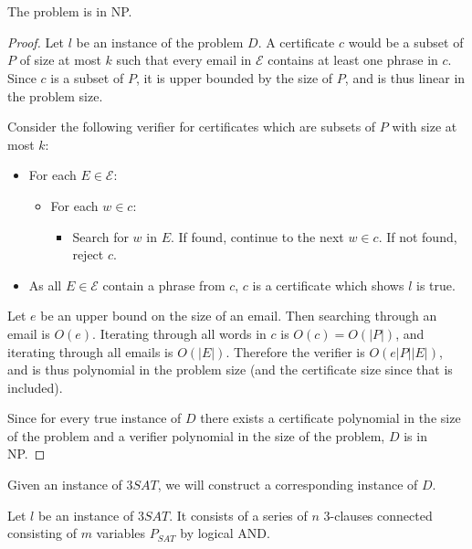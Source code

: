 \documentclass[11pt]{article}
\begin{document}
\section{}

The problem is in NP.
\begin{proof}
    Let $l$ be an instance of the problem $D$. A certificate $c$ would be a subset of $P$ of size at most $k$ such that every email in $\mathcal{E}$ contains at least one phrase in $c$. Since $c$ is a subset of $P$, it is upper bounded by the size of $P$, and is thus linear in the problem size.

    Consider the following verifier for certificates which are subsets of $P$ with size at most $k$: \begin{itemize}
        \item For each $E \in \mathcal{E}$:
            \begin{itemize}
                \item For each $w \in c$:
                    \begin{itemize}
                        \item Search for $w$ in $E$. If found, continue to the next $w \in c$. If not found, reject $c$.
                    \end{itemize}
            \end{itemize}
        \item As all $E \in \mathcal{E}$ contain a phrase from $c$, $c$ is a certificate which shows $l$ is true.
    \end{itemize}

    Let $e$ be an upper bound on the size of an email. Then searching through an email is $O(e)$. Iterating through all words in $c$ is $O(c) = O(|P|)$, and iterating through all emails is $O(|E|)$. Therefore the verifier is $O(e|P||E|)$, and is thus polynomial in the problem size (and the certificate size since that is included).

    Since for every true instance of $D$ there exists a certificate polynomial in the size of the problem and a verifier polynomial in the size of the problem, $D$ is in NP.
\end{proof}

    Given an instance of $3SAT$, we will construct a corresponding instance of $D$. 

    Let $l$ be an instance of $3SAT$. It consists of a series of $n$ 3-clauses connected consisting of $m$ variables $P_{SAT}$ by logical AND. 
\end{document}
